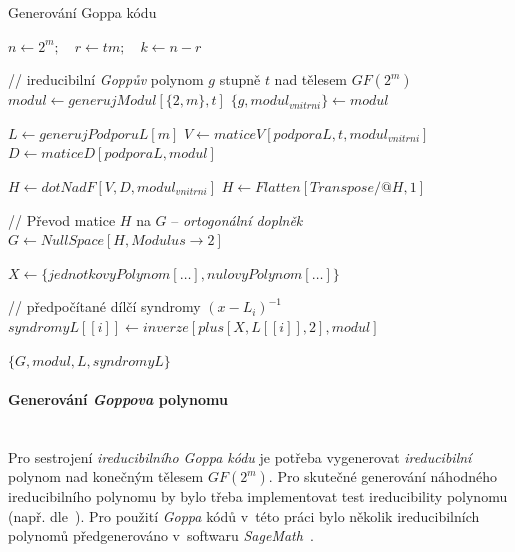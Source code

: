 \documentclass[thesis=M,czech,hidelinks]{FITthesis}[2012/06/26]
\newcommand{\0}{{\textcolor[gray]{0.75}{0}}}
\newenvironment{algoritmus}{
    \floatname{algorithm}{Algoritmus}
    \begin{algorithm}
}{\end{algorithm}}
\begin{document}
\begin{algoritmus}[!ht]
    \caption{Generování Goppa kódu}
    \begin{algorithmic}[1]
        \State $ n \gets 2^m ; \quad r \gets t m ; \quad k \gets n - r $

        // ireducibilní \emph{Goppův} polynom $g$ stupně $t$ nad tělesem $GF(2^m)$
        \State $ modul \gets generujModul[ \{ 2, m \}, t ] $
        \State $ \{ g, modul_{vnitrni} \} \gets modul $

        \hfil
        \State $ L \gets generujPodporuL[ m ] $
        \State $ V \gets maticeV[ podporaL, t, modul_{vnitrni} ] $
        \State $ D \gets maticeD[ podporaL, modul ] $

        \hfil
        \State $ H \gets dotNadF[ V, D, modul_{vnitrni} ] $
        \State $ H \gets Flatten[Transpose \mathbin{/@} H, 1 ] $

        // Převod matice $H$ na $G$ -- \emph{ortogonální doplněk}
        \State $ G \gets NullSpace[ H, Modulus \to 2 ] $

        \hfil
        \State $ X \gets \{ jednotkovyPolynom[\ldots], nulovyPolynom[\ldots] \} $

        // předpočítané dílčí syndromy $\left(x-L_i\right)^{-1}$
            \State $ syndromyL[[i]] \gets inverze[ plus[X, L[[i]], 2], modul ] $
        \EndFor

        \hfil
        \State \Return $ \{ G, modul, L, syndromyL \}$
     \EndFunction
    \end{algorithmic}
\end{algoritmus}


\paragraph{Generování \emph{Goppova} polynomu} \hfil \\
Pro sestrojení \emph{ireducibilního Goppa kódu} je potřeba vygenerovat
\emph{ireducibilní} polynom nad konečným tělesem $GF(2^m)$. Pro skutečné
generování náhodného ireducibilního polynomu by bylo třeba implementovat test
ireducibility polynomu (např. dle~\cite{Gao}). Pro použití \emph{Goppa} kódů
v~této práci bylo několik ireducibilních polynomů předgenerováno v~softwaru
\emph{SageMath}~\cite{Sage}.
\end{document}
